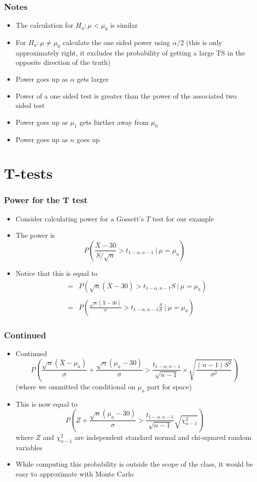 \documentclass[aspectratio=169]{beamer}
\begin{document}
\begin{frame}\frametitle{Notes}
\begin{itemize}
\item The calculation for $H_a:\mu < \mu_0$ is similar
\item For $H_a: \mu \neq \mu_0$ calculate the one sided power using
  $\alpha / 2$ (this is only approximately right, it excludes the probability of
  getting a large TS in the opposite direction of the truth)
\item Power goes up as $\alpha$ gets larger
\item Power of a one sided test is greater than the power of the
  associated two sided test
\item Power goes up as $\mu_1$ gets further away from $\mu_0$
\item Power goes up as $n$ goes up
\end{itemize}
\end{frame}


\section{T-tests}
\begin{frame}\frametitle{Power for the T test}
\begin{itemize}
\item Consider calculating power for a Gossett's $T$ test for our example
\item The power is
  $$
  P\left(\frac{\bar X - 30}{S /\sqrt{n}} > t_{1-\alpha, n-1} ~|~ \mu = \mu_a \right)
  $$
\item Notice that this is equal to
  \begin{eqnarray*}
& = &     
  P\left(\sqrt{n}(\bar X - 30) > t_{1 - \alpha, n-1} S ~|~ \mu = \mu_a \right)\\ \\
& = &     
  P\left(\frac{\sqrt{n}(\bar X - 30)}{\sigma}   > t_{1-\alpha, n-1} \frac{S}{\sigma} ~|~ \mu = \mu_a \right)
  \end{eqnarray*}
\end{itemize}
\end{frame}

\begin{frame}\frametitle{Continued}
\begin{itemize}
\item Continued
$$
  P\left(\frac{\sqrt{n}(\bar X - \mu_a)}{\sigma} + \frac{\sqrt{n}(\mu_a - 30)}{\sigma} > \frac{t_{1-\alpha, n-1}}{\sqrt{n-1}}\times \sqrt{\frac{(n-1) S^2}{\sigma^2}} \right)$$
(where we ommitted the conditional on $\mu_a$ part for space)
\item This is now equal to
$$
P\left(Z + \frac{\sqrt{n}(\mu_a - 30)}{\sigma} >  \frac{t_{1 - \alpha, n-1}}{\sqrt{n-1}} \sqrt{\chi^2_{n-1}}\right)
$$
where $Z$ and $\chi^2_{n-1}$ are independent standard normal and chi-squared random variables
\item While computing this probability is outside the scope of the class, it would be easy to approximate with Monte Carlo
\end{itemize}
\end{frame}
\end{document}
